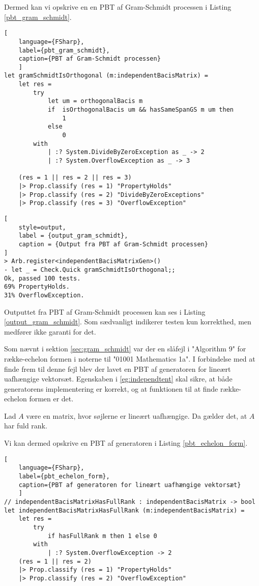 Dermed kan vi opskrive en en PBT af Gram-Schmidt processen i Listing \ref{pbt_gram_schmidt}.


\begin{lstlisting}[
    language={FSharp}, 
    label={pbt_gram_schmidt}, 
    caption={PBT af Gram-Schmidt processen}
    ]
let gramSchmidtIsOrthogonal (m:independentBacisMatrix) =
    let res =
        try 
            let um = orthogonalBacis m
            if  isOrthogonalBacis um && hasSameSpanGS m um then 
                1 
            else 
                0
        with
            | :? System.DivideByZeroException as _ -> 2
            | :? System.OverflowException as _ -> 3

    (res = 1 || res = 2 || res = 3)
    |> Prop.classify (res = 1) "PropertyHolds"
    |> Prop.classify (res = 2) "DivideByZeroExceptions"
    |> Prop.classify (res = 3) "OverflowException"
\end{lstlisting}

\begin{lstlisting}[
    style=output,
    label = {output_gram_schmidt},
    caption = {Output fra PBT af Gram-Schmidt processen}
]
> Arb.register<independentBacisMatrixGen>()
- let _ = Check.Quick gramSchmidtIsOrthogonal;;
Ok, passed 100 tests.
69% PropertyHolds.
31% OverflowException.
\end{lstlisting}

Outputtet fra PBT af Gram-Schmidt processen kan ses i Listing \ref{output_gram_schmidt}. Som sædvanligt indikerer testen kun korrekthed, men medfører ikke garanti for det.

Som nævnt i sektion \ref{sec:gram_schmidt} var der en slåfejl i "Algorithm 9" for række-echelon formen i noterne til "01001 Mathematics 1a". I forbindelse med at finde frem til denne fejl blev der lavet en PBT af generatoren for lineært uafhængige vektorsæt. Egenskaben i \ref{eg:independtent} skal sikre, at både generatorens implementering er korrekt, og at funktionen til at finde række-echelon formen er det.

\vspace{0.5cm}
\begin{egenskab}\label{eg:independtent}
    Lad \( A \) være en matrix, hvor søjlerne er lineært uafhængige. Da gælder det, at \( A \) har fuld rank.
\end{egenskab}

Vi kan dermed opskrive en PBT af generatoren i Listing \ref{pbt_echelon_form}.

\begin{lstlisting}[
    language={FSharp}, 
    label={pbt_echelon_form}, 
    caption={PBT af generatoren for lineært uafhængige vektorsæt}
    ]
// independentBacisMatrixHasFullRank : independentBacisMatrix -> bool
let independentBacisMatrixHasFullRank (m:independentBacisMatrix) =
    let res =
        try 
            if hasFullRank m then 1 else 0
        with
            | :? System.OverflowException -> 2
    (res = 1 || res = 2)
    |> Prop.classify (res = 1) "PropertyHolds"
    |> Prop.classify (res = 2) "OverflowException"
\end{lstlisting}

